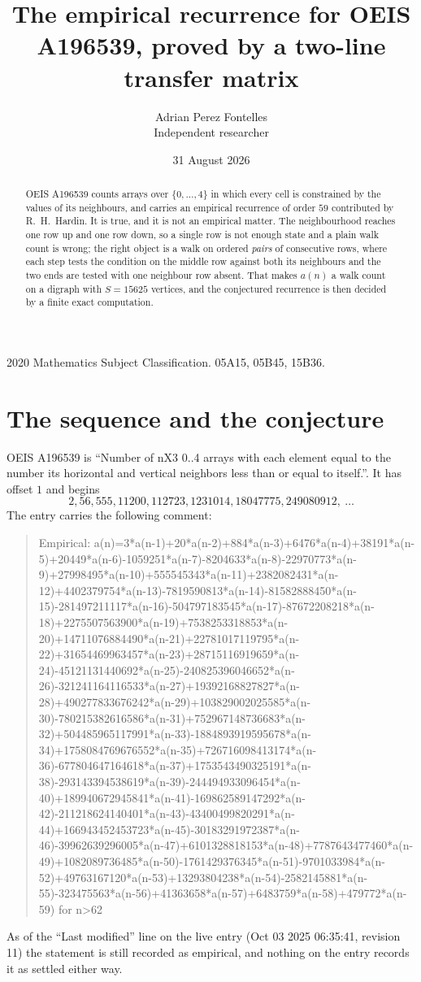\documentclass[11pt,a4paper]{article}
\title{The empirical recurrence for OEIS A196539, proved by a two-line transfer matrix}
\author{Adrian Perez Fontelles\\ \small Independent researcher}
\date{31 August 2026}
\theoremstyle{plain}
\theoremstyle{definition}
\begin{document}
\maketitle

\begin{abstract}
OEIS A196539 counts arrays over $\{0,\dots,4\}$ in which every cell is constrained by the
values of its neighbours, and carries an empirical recurrence of order $59$ contributed
by R.~H.~Hardin. It is true, and it is not an empirical matter. The neighbourhood reaches one
row up and one row down, so a single row is not enough state and a plain walk count
is wrong; the right object is a walk on ordered \emph{pairs} of consecutive rows, where
each step tests the condition on the middle row against both its neighbours and the two
ends are tested with one neighbour row absent. That makes $a(n)$ a walk count on a digraph
with $S=15625$ vertices, and the conjectured recurrence is then decided by a finite exact
computation.
\end{abstract}

\noindent\small 2020 Mathematics Subject Classification. 05A15, 05B45, 15B36.\normalsize

\section{The sequence and the conjecture}

OEIS A196539 is ``Number of nX3 0..4 arrays with each element equal to the number its horizontal and vertical neighbors less than or equal to itself.''. It has offset $1$ and begins
\[
2, 56, 555, 11200, 112723, 1231014, 18047775, 249080912,\ \dots
\]
The entry carries the following comment:
\begin{quote}\small
Empirical: a(n)=3*a(n-1)+20*a(n-2)+884*a(n-3)+6476*a(n-4)+38191*a(n-5)+20449*a(n-6)-1059251*a(n-7)-8204633*a(n-8)-22970773*a(n-9)+27998495*a(n-10)+555545343*a(n-11)+2382082431*a(n-12)+4402379754*a(n-13)-7819590813*a(n-14)-81582888450*a(n-15)-281497211117*a(n-16)-504797183545*a(n-17)-87672208218*a(n-18)+2275507563900*a(n-19)+7538253318853*a(n-20)+14711076884490*a(n-21)+22781017119795*a(n-22)+31654469963457*a(n-23)+28715116919659*a(n-24)-45121131440692*a(n-25)-240825396046652*a(n-26)-321241164116533*a(n-27)+19392168827827*a(n-28)+490277833676242*a(n-29)+103829002025585*a(n-30)-780215382616586*a(n-31)+752967148736683*a(n-32)+504485965117991*a(n-33)-1884893919595678*a(n-34)+1758084769676552*a(n-35)+726716098413174*a(n-36)-677804647164618*a(n-37)+1753543490325191*a(n-38)-293143394538619*a(n-39)-244494933096454*a(n-40)+189940672945841*a(n-41)-169862589147292*a(n-42)-211218624140401*a(n-43)-43400499820291*a(n-44)+166943452453723*a(n-45)-30183291972387*a(n-46)-39962639296005*a(n-47)+6101328818153*a(n-48)+7787643477460*a(n-49)+1082089736485*a(n-50)-1761429376345*a(n-51)-9701033984*a(n-52)+49763167120*a(n-53)+13293804238*a(n-54)-2582145881*a(n-55)-323475563*a(n-56)+41363658*a(n-57)+6483759*a(n-58)+479772*a(n-59) for n>62
\end{quote}
As of the ``Last modified'' line on the live entry (Oct 03 2025 06:35:41, revision 11) the statement is
still recorded as empirical, and nothing on the entry records it as settled either way.
\end{document}
